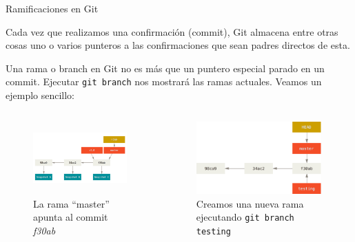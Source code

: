 \documentclass{beamer}
\begin{document}
\begin{frame}{Ramificaciones en Git}

    Cada vez que realizamos una confirmación (commit), Git almacena entre otras cosas uno o varios punteros a las confirmaciones que
    sean padres directos de esta.

    Una rama o branch en Git no es más que un puntero especial parado en un commit. Ejecutar \texttt{git branch} nos mostrará las ramas actuales. Veamos un ejemplo sencillo:

    \begin{columns}
        \begin{figure}[ht]
            \begin{center}
                \includegraphics[height=1.1in]{images/branch-and-history.png}
            \end{center}
            \caption{La rama ``master'' apunta al commit \textit{f30ab}}
        \end{figure}
        \begin{figure}[ht]
            \begin{center}
                \includegraphics[height=1.1in]{images/head-to-master.png}
            \end{center}
            \caption{Creamos una nueva rama ejecutando \texttt{git branch testing}}
        \end{figure}
    \end{columns}

\end{frame}
\end{document}
